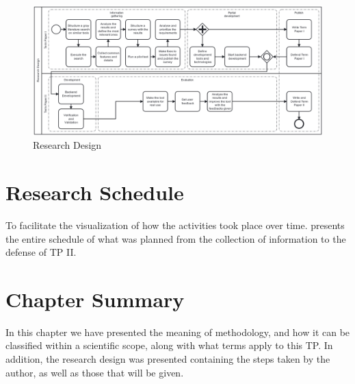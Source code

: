 \begin{figure}[htb]
  \caption{Research Design}\label{fig:research-design}
  \begin{center}
    \includegraphics[width=16cm]{img/researchDiagram.png}
  \end{center}
\end{figure}

\section{Research Schedule}\label{sec:met-schedule}


To facilitate the visualization of how the activities took place over time. 
 presents the entire schedule of what was planned from the collection of information to the defense of \acl{TP} II.




\section{Chapter Summary}\label{sec:met-summary}


In this chapter we have presented the meaning of methodology, and how it can be classified within a scientific scope, along with what terms apply to this \ac{TP}. 
In addition, the research design was presented containing the steps taken by the author, as well as those that will be given.


